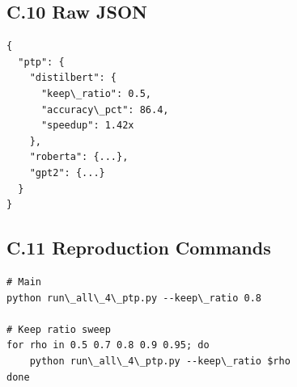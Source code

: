 \subsection{C.10 Raw JSON}

\begin{lstlisting}
{
  "ptp": {
    "distilbert": {
      "keep\_ratio": 0.5,
      "accuracy\_pct": 86.4,
      "speedup": 1.42x
    },
    "roberta": {...},
    "gpt2": {...}
  }
}
\end{lstlisting}

\subsection{C.11 Reproduction Commands}

\begin{lstlisting}
# Main
python run\_all\_4\_ptp.py --keep\_ratio 0.8

# Keep ratio sweep
for rho in 0.5 0.7 0.8 0.9 0.95; do
    python run\_all\_4\_ptp.py --keep\_ratio $rho
done
\end{lstlisting}

